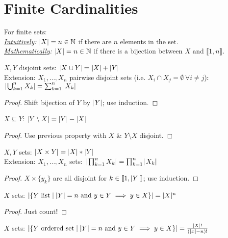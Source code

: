 \chapter{Finite Cardinalities}

\begin{definition}[Cardinality] For finite sets:\\
	\emph{\underline{Intuitively}:} $| X | = n \in \mathbb{N}$ if there are $n$ elements in the set.\\
	\emph{\underline{Mathematically}:} $| X | = n \in \mathbb{N}$ if there is a bijection between $X$ and $\llbracket 1,n \rrbracket$.
\end{definition}
\begin{property}
	$X,Y$ disjoint sets: $| X \cup Y | = | X | + | Y |$\\
	Extension: $X_1, \dots, X_n$ pairwise disjoint sets (i.e. $X_i \cap X_j = \emptyset \ \forall i \neq j$): $| \bigcup_{k=1}^n X_k | = \sum_{k=1}^{n} | X_k |$
\end{property}
\begin{proof}
	Shift bijection of $Y$ by $| Y |$; use induction.
\end{proof}
\begin{property}
	$X \subseteq Y$: $| Y \setminus X | = | Y | - | X |$
\end{property}
\begin{proof}
	Use previous property with $X$ \& $Y \setminus X$ disjoint.
\end{proof}
\begin{property}
	$X,Y$ sets: $| X \times Y | = | X | * | Y |$\\
	Extension: $X_1, \dots, X_n$ sets: $| \prod_{k=1}^n X_k | = \prod_{k=1}^{n} | X_k |$
\end{property}
\begin{proof}
	$X \times \{y_k\}$  are all disjoint for $k \in \llbracket 1,| Y | \rrbracket$; use induction.
\end{proof}
\begin{property}
	$X$ sets: $|  \{ Y \text{ list} \mid | Y |=n \text{ and } y \in Y \implies y \in X \}  | = | X |^n$
\end{property}
\begin{proof}
	Just count!
\end{proof}
\begin{property}
	$X$ sets: $|  \{ Y \text{ ordered set} \mid | Y |=n \text{ and } y \in Y \implies y \in X \}  | = \frac{| X |!}{(| x |-n)!}$
\end{property}
